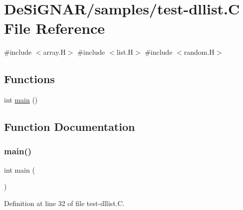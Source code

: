 \hypertarget{test-dllist_8_c}{}\section{De\+Si\+G\+N\+A\+R/samples/test-\/dllist.C File Reference}
\label{test-dllist_8_c}
{\ttfamily \#include $<$array.\+H$>$}\newline
{\ttfamily \#include $<$list.\+H$>$}\newline
{\ttfamily \#include $<$random.\+H$>$}\newline
\subsection*{Functions}
\begin{DoxyCompactItemize}
\item 
int \hyperlink{test-dllist_8_c_ae66f6b31b5ad750f1fe042a706a4e3d4}{main} ()
\end{DoxyCompactItemize}


\subsection{Function Documentation}
\mbox{\label{test-dllist_8_c_ae66f6b31b5ad750f1fe042a706a4e3d4}} 
\subsubsection{\texorpdfstring{main()}{main()}}
{\footnotesize\ttfamily int main (\begin{DoxyParamCaption}{ }\end{DoxyParamCaption})}



Definition at line 32 of file test-\/dllist.\+C.

